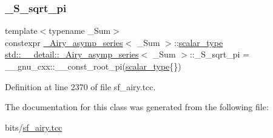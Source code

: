 \subsubsection{\texorpdfstring{\+\_\+\+S\+\_\+sqrt\+\_\+pi}{\_S\_sqrt\_pi}}
{\footnotesize\ttfamily template$<$typename \+\_\+\+Sum$>$ \\
constexpr \hyperlink{classstd_1_1____detail_1_1__Airy__asymp__series}{\+\_\+\+Airy\+\_\+asymp\+\_\+series}$<$ \+\_\+\+Sum $>$\+::\hyperlink{classstd_1_1____detail_1_1__Airy__asymp__series_ac2d0fa6d86d7a83c06dca057d0dfec3a}{scalar\+\_\+type} \hyperlink{classstd_1_1____detail_1_1__Airy__asymp__series}{std\+::\+\_\+\+\_\+detail\+::\+\_\+\+Airy\+\_\+asymp\+\_\+series}$<$ \+\_\+\+Sum $>$\+::\+\_\+\+S\+\_\+sqrt\+\_\+pi = \+\_\+\+\_\+gnu\+\_\+cxx\+::\+\_\+\+\_\+const\+\_\+root\+\_\+pi(\hyperlink{classstd_1_1____detail_1_1__Airy__asymp__series_ac2d0fa6d86d7a83c06dca057d0dfec3a}{scalar\+\_\+type}\{\})\hspace{0.3cm}{\ttfamily [static]}}



Definition at line 2370 of file sf\+\_\+airy.\+tcc.



The documentation for this class was generated from the following file\+:\begin{DoxyCompactItemize}
\item 
bits/\hyperlink{sf__airy_8tcc}{sf\+\_\+airy.\+tcc}\end{DoxyCompactItemize}
